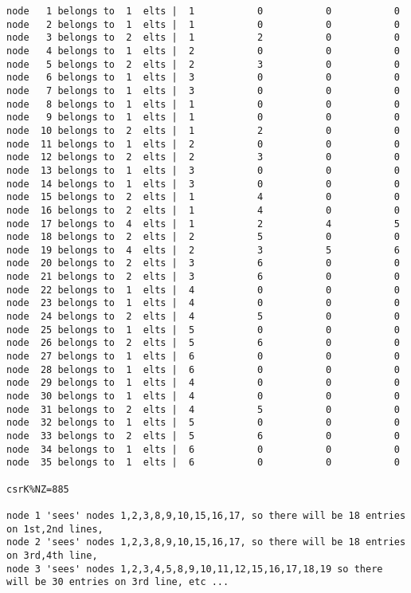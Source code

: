 \begin{small}
\begin{verbatim}
node   1 belongs to  1  elts |  1           0           0           0
node   2 belongs to  1  elts |  1           0           0           0
node   3 belongs to  2  elts |  1           2           0           0
node   4 belongs to  1  elts |  2           0           0           0
node   5 belongs to  2  elts |  2           3           0           0
node   6 belongs to  1  elts |  3           0           0           0
node   7 belongs to  1  elts |  3           0           0           0
node   8 belongs to  1  elts |  1           0           0           0
node   9 belongs to  1  elts |  1           0           0           0
node  10 belongs to  2  elts |  1           2           0           0
node  11 belongs to  1  elts |  2           0           0           0
node  12 belongs to  2  elts |  2           3           0           0
node  13 belongs to  1  elts |  3           0           0           0
node  14 belongs to  1  elts |  3           0           0           0
node  15 belongs to  2  elts |  1           4           0           0
node  16 belongs to  2  elts |  1           4           0           0
node  17 belongs to  4  elts |  1           2           4           5
node  18 belongs to  2  elts |  2           5           0           0
node  19 belongs to  4  elts |  2           3           5           6
node  20 belongs to  2  elts |  3           6           0           0
node  21 belongs to  2  elts |  3           6           0           0
node  22 belongs to  1  elts |  4           0           0           0
node  23 belongs to  1  elts |  4           0           0           0
node  24 belongs to  2  elts |  4           5           0           0
node  25 belongs to  1  elts |  5           0           0           0
node  26 belongs to  2  elts |  5           6           0           0
node  27 belongs to  1  elts |  6           0           0           0
node  28 belongs to  1  elts |  6           0           0           0
node  29 belongs to  1  elts |  4           0           0           0
node  30 belongs to  1  elts |  4           0           0           0
node  31 belongs to  2  elts |  4           5           0           0
node  32 belongs to  1  elts |  5           0           0           0
node  33 belongs to  2  elts |  5           6           0           0
node  34 belongs to  1  elts |  6           0           0           0
node  35 belongs to  1  elts |  6           0           0           0

csrK%NZ=885

node 1 'sees' nodes 1,2,3,8,9,10,15,16,17, so there will be 18 entries on 1st,2nd lines,
node 2 'sees' nodes 1,2,3,8,9,10,15,16,17, so there will be 18 entries on 3rd,4th line,
node 3 'sees' nodes 1,2,3,4,5,8,9,10,11,12,15,16,17,18,19 so there will be 30 entries on 3rd line, etc ...


\end{verbatim}
\end{small}
